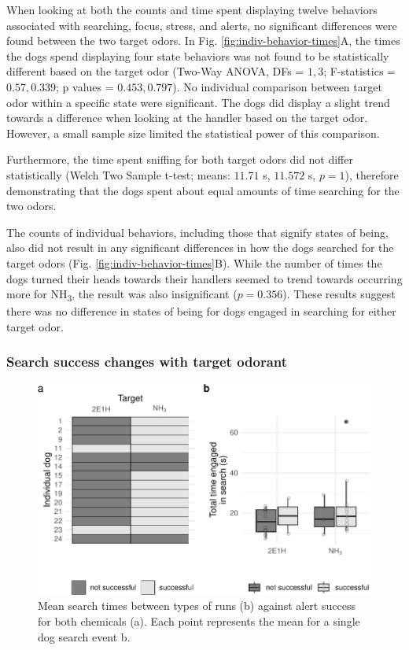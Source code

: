 \documentclass[
]{article}
\begin{document}
When looking at both the counts and time spent displaying twelve behaviors associated with searching, focus, stress, and alerts, no significant differences were found between the two target odors. In Fig. \ref{fig:indiv-behavior-times}A, the times the dogs spend displaying four state behaviors was not found to be statistically different based on the target odor (Two-Way ANOVA, DFs = \(1, 3\); F-statistics = \(0.57, 0.339\); p values = \(0.453, 0.797\)). No individual comparison between target odor within a specific state were significant. The dogs did display a slight trend towards a difference when looking at the handler based on the target odor. However, a small sample size limited the statistical power of this comparison.

Furthermore, the time spent sniffing for both target odors did not differ statistically (Welch Two Sample t-test; means: \(11.71\) s, \(11.572\) s, \(p = 1\)), therefore demonstrating that the dogs spent about equal amounts of time searching for the two odors.

The counts of individual behaviors, including those that signify states of being, also did not result in any significant differences in how the dogs searched for the target odors (Fig. \ref{fig:indiv-behavior-times}B). While the number of times the dogs turned their heads towards their handlers seemed to trend towards occurring more for NH\textsubscript{3}, the result was also insignificant (\(p = 0.356\)). These results suggest there was no difference in states of being for dogs engaged in searching for either target odor.

\hypertarget{search-success-changes-with-target-odorant}{%
\subsubsection{Search success changes with target odorant}\label{search-success-changes-with-target-odorant}}

\begin{figure}
\centering
\includegraphics{main-manuscript_files/figure-latex/search-times-1.pdf}
\caption{\label{fig:search-times}Mean search times between types of runs (b) against alert success for both chemicals (a). Each point represents the mean for a single dog search event b.}
\end{figure}
\end{document}
